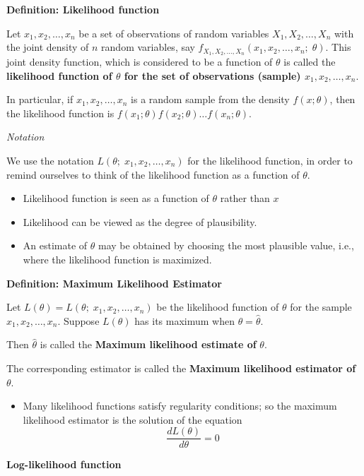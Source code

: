 \documentclass[]{book}
\providecommand{\tightlist}{%
  \setlength{\itemsep}{0pt}\setlength{\parskip}{0pt}}
\begin{document}
\textbf{Definition: Likelihood function}

Let \(x_1,x_2, \dots, x_n\) be a set of observations of random variables \(X_1, X_2, \dots, X_n\) with the joint density of \(n\) random variables, say \(f_{X_1, X_2, \dots, X_n}(x_1,x_2, \dots, x_n;\; \theta)\). This joint density function, which is considered to be a function of \(\theta\) is called the \textbf{likelihood function of \(\theta\) for the set of observations (sample) \(x_1,x_2, \dots, x_n.\)}

In particular, if \(x_1,x_2, \dots, x_n\) is a random sample from the density \(f(x; \theta)\), then the likelihood function is \(f(x_1; \theta)f(x_2; \theta) \dots f(x_n; \theta).\)

\emph{Notation}

We use the notation \(L(\theta;\;x_1,x_2, \dots, x_n)\) for the likelihood function, in order to remind ourselves to think of the likelihood function as a function of \(\theta.\)

\begin{itemize}
\tightlist
\item
  Likelihood function is seen as a function of \(\theta\) rather than \(x\)
\item
  Likelihood can be viewed as the degree of plausibility.
\item
  An estimate of \(\theta\) may be obtained by choosing the most plausible value, i.e., where the likelihood function is maximized.
\end{itemize}

\textbf{Definition: Maximum Likelihood Estimator}

Let \(L(\theta)=L(\theta;\;x_1,x_2, \dots, x_n)\) be the likelihood function of \(\theta\) for the sample \(x_1,x_2, \dots, x_n.\) Suppose \(L(\theta)\) has its maximum when \(\theta = \hat{\theta}.\)

Then \(\hat{\theta}\) is called the \textbf{Maximum likelihood estimate of} \(\theta\).

The corresponding estimator is called the \textbf{Maximum likelihood estimator of} \(\theta\).

\begin{itemize}
\tightlist
\item
  Many likelihood functions satisfy regularity conditions; so the maximum likelihood estimator is the solution of the equation \[\frac{dL(\theta)}{d\theta} = 0\]
\end{itemize}

\textbf{Log-likelihood function}
\end{document}
